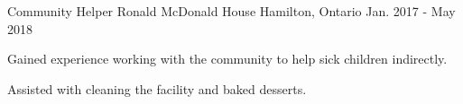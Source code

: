 \begin{cventries}
  \cventry
    {Community Helper} %
    {Ronald McDonald House} %
    {Hamilton, Ontario} %
    {Jan. 2017 - May 2018} %
    {
      \begin{cvitems} %
        \item {Gained experience working with the community to help sick children indirectly.}
        \item {Assisted with cleaning the facility and baked desserts.}
      \end{cvitems}
    }


\end{cventries}
